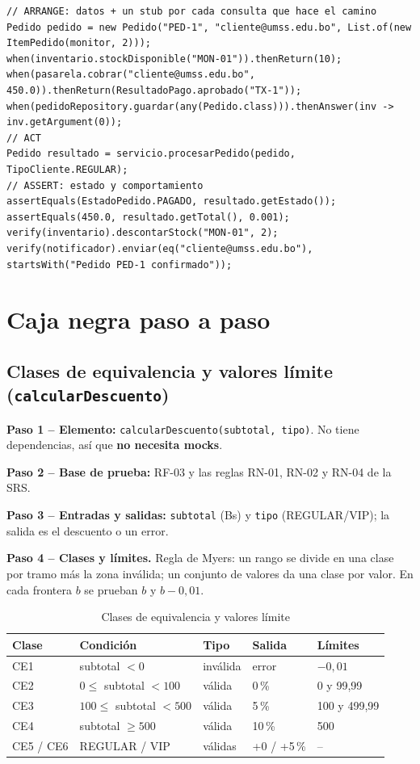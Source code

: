 \documentclass[11pt,a4paper,oneside]{report}
\newcommand{\code}[1]{\texttt{#1}}
\begin{document}
\begin{lstlisting}[caption={Versión final (V5) con la estructura Arrange -- Act -- Assert}]
// ARRANGE: datos + un stub por cada consulta que hace el camino
Pedido pedido = new Pedido("PED-1", "cliente@umss.edu.bo", List.of(new ItemPedido(monitor, 2)));
when(inventario.stockDisponible("MON-01")).thenReturn(10);
when(pasarela.cobrar("cliente@umss.edu.bo", 450.0)).thenReturn(ResultadoPago.aprobado("TX-1"));
when(pedidoRepository.guardar(any(Pedido.class))).thenAnswer(inv -> inv.getArgument(0));
// ACT
Pedido resultado = servicio.procesarPedido(pedido, TipoCliente.REGULAR);
// ASSERT: estado y comportamiento
assertEquals(EstadoPedido.PAGADO, resultado.getEstado());
assertEquals(450.0, resultado.getTotal(), 0.001);
verify(inventario).descontarStock("MON-01", 2);
verify(notificador).enviar(eq("cliente@umss.edu.bo"), startsWith("Pedido PED-1 confirmado"));
\end{lstlisting}

\section{Caja negra paso a paso}
\subsection{Clases de equivalencia y valores límite (\code{calcularDescuento})}
\textbf{Paso 1 -- Elemento:} \code{calcularDescuento(subtotal, tipo)}. No tiene dependencias, así que \textbf{no necesita mocks}.

\textbf{Paso 2 -- Base de prueba:} RF-03 y las reglas RN-01, RN-02 y RN-04 de la SRS.

\textbf{Paso 3 -- Entradas y salidas:} \code{subtotal} (Bs) y \code{tipo} (REGULAR/VIP); la salida es el descuento o un error.

\textbf{Paso 4 -- Clases y límites.} Regla de Myers: un rango se divide en una clase por tramo más la zona inválida; un conjunto de valores da una clase por valor. En cada frontera $b$ se prueban $b$ y $b - 0{,}01$.

\begin{table}[H]
\centering
\caption{Clases de equivalencia y valores límite}
\small
\begin{tabular}{lllll}
\toprule
\textbf{Clase} & \textbf{Condición} & \textbf{Tipo} & \textbf{Salida} & \textbf{Límites}\\
\midrule
CE1 & subtotal $< 0$ & inválida & error & $-0{,}01$\\
CE2 & $0 \leq$ subtotal $< 100$ & válida & 0\,\% & 0 y 99,99\\
CE3 & $100 \leq$ subtotal $< 500$ & válida & 5\,\% & 100 y 499,99\\
CE4 & subtotal $\geq 500$ & válida & 10\,\% & 500\\
CE5 / CE6 & REGULAR / VIP & válidas & +0 / +5\,\% & --\\
\bottomrule
\end{tabular}
\end{table}
\end{document}
